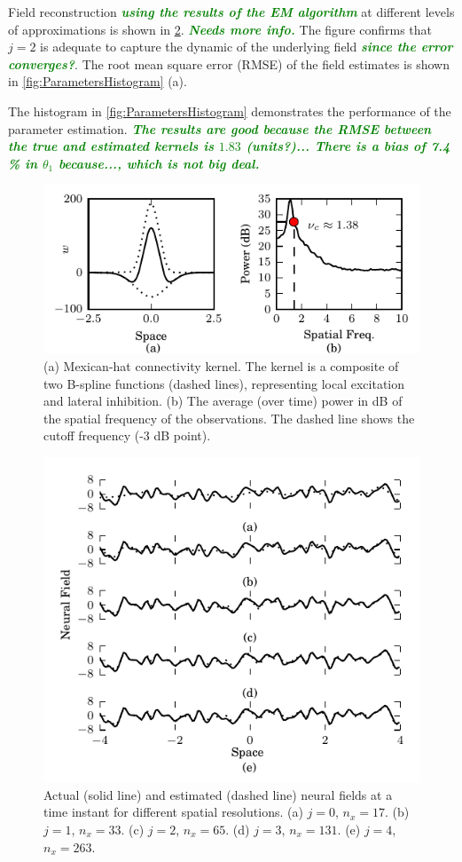 \documentclass[journal,a4paper]{IEEEtran}
\newcommand{\dean}[1]{\textsf{\emph{\textbf{\textcolor{green}{#1}}}}}
\begin{document}
Field reconstruction \dean{using the results of the EM algorithm} at different levels of approximations is shown in \figurename{\ref{fig:FieldEstimates}}. \dean{Needs more info.} The figure confirms that $j=2$ is adequate to capture the dynamic of the underlying field \dean{since the error converges?}. The root mean square error (RMSE) of the field estimates is shown in \figurename{\ref{fig:ParametersHistogram}} (a). 

The histogram in \figurename{\ref{fig:ParametersHistogram}} demonstrates the performance of the parameter estimation. \dean{The results are good because the RMSE between the true and estimated kernels is $1.83$ (units?)... There is a bias of 7.4 \% in $\theta_1$ because..., which is not big deal.}
\begin{figure}[!h]
 \centering
 \includegraphics[scale=.9]{./Graph/ObservationFreqResponse.pdf}
 \caption{(a) Mexican-hat connectivity kernel. The kernel is a composite of two B-spline
functions (dashed lines), representing local excitation and lateral inhibition. (b) The average (over time) power in dB of the spatial frequency of the observations. The dashed line shows the cutoff frequency (-3 dB point).}
\label{fig:KernelAndFreqResponse} 
  \end{figure} 
\begin{figure}[!h] 
 \centering
 \includegraphics[scale=0.9]{./Graph/Field.pdf}
 \caption{Actual (solid line) and estimated (dashed line) neural fields at a time instant for different spatial resolutions. (a) $j=0$, $n_x=17$. (b) $j=1$, $n_x=33$. (c) $j=2$, $n_x=65$. (d) $j=3$, $n_x=131$. (e) $j=4$, $n_x=263$.}
 \label{fig:FieldEstimates}
 \end{figure} 
\end{document}

